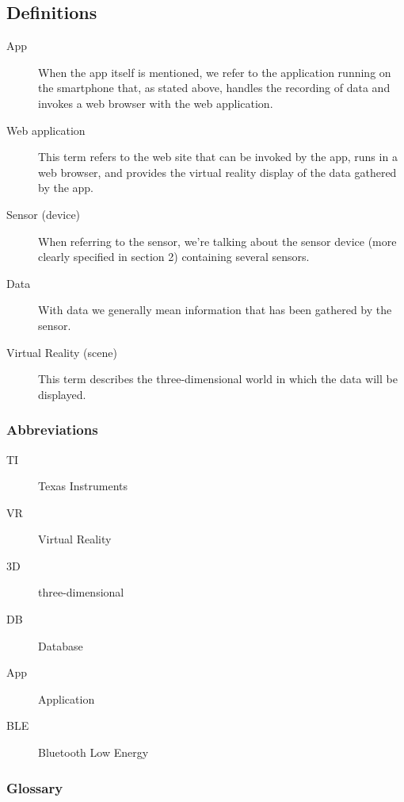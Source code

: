 \subsection{Definitions}

\begin{description}
	\item[App] When the app itself is mentioned, we refer to the application running on the smartphone that, as stated above, handles the recording of data and invokes a web browser with the web application.
	\item[Web application] This term refers to the web site that can be invoked by the app, runs in a web browser, and provides the virtual reality display of the data gathered by the app.
	\item[Sensor (device)] When referring to the sensor, we're talking about the sensor device (more clearly specified in section 2) containing several sensors.
	\item[Data] With data we generally mean information that has been gathered by the sensor.
	\item[Virtual Reality (scene)] This term describes the three-dimensional world in which the data will be displayed.

\end{description}


\subsubsection{Abbreviations}

\begin{description}
	\item[TI] Texas Instruments
	\item[VR] Virtual Reality
	\item[3D] three-dimensional
	\item[DB] Database
	\item[App] Application
	\item[BLE] Bluetooth Low Energy
\end{description}

\subsubsection{Glossary}

